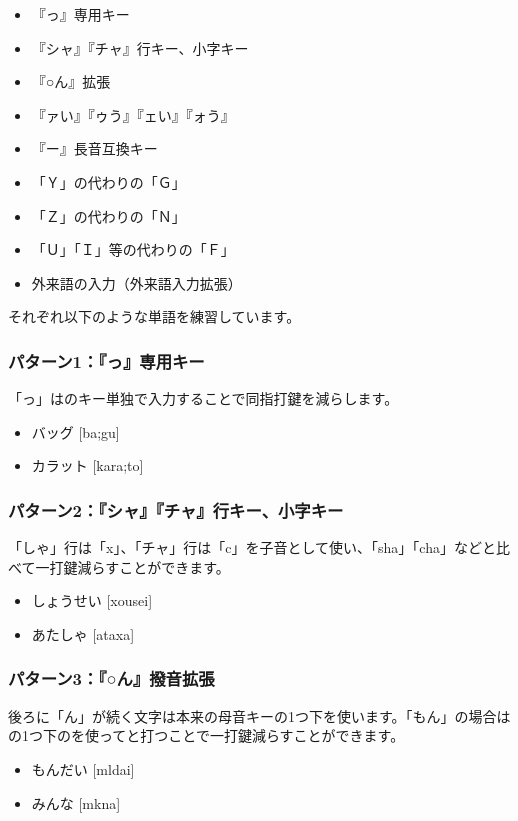 \begin{itemize}
 \item 『っ』専用キー
 \item 『シャ』『チャ』行キー、小字キー
 \item 『○ん』拡張
 \item 『ァい』『ゥう』『ェい』『ォう』
 \item 『ー』長音互換キー
 \item 「Ｙ」の代わりの「Ｇ」
 \item 「Ｚ」の代わりの「Ｎ」
 \item 「Ｕ」「Ｉ」等の代わりの「Ｆ」
 \item 外来語の入力（外来語入力拡張）
\end{itemize}

それぞれ以下のような単語を練習しています。
\subsubsection*{パターン1：『っ』専用キー}
「っ」は\key{;}のキー単独で入力することで同指打鍵を減らします。
\begin{itemize}
 \item バッグ [ba;gu]
 \item カラット [kara;to]
\end{itemize}

\subsubsection*{パターン2：『シャ』『チャ』行キー、小字キー}
「しゃ」行は「x」、「チャ」行は「c」を子音として使い、「sha」「cha」などと比べて一打鍵減らすことができます。
\begin{itemize}
 \item しょうせい [xousei]
 \item あたしゃ [ataxa]
\end{itemize}

\subsubsection*{パターン3：『○ん』撥音拡張}
後ろに「ん」が続く文字は本来の母音キーの1つ下を使います。「もん」の場合はの1つ下のを使ってと打つことで一打鍵減らすことができます。
\begin{itemize}
 \item もんだい [mldai]
 \item みんな [mkna]
\end{itemize}

